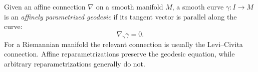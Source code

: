 
Given an affine connection $\nabla$ on a smooth manifold $M$, a smooth curve $\gamma:I\to M$ is an \emph{affinely parametrized geodesic} if its tangent vector is parallel along the curve:
\[
\nabla_{\dot\gamma}\dot\gamma=0.
\]
For a Riemannian manifold the relevant connection is usually the Levi--Civita connection. Affine reparametrizations preserve the geodesic equation, while arbitrary reparametrizations generally do not.
